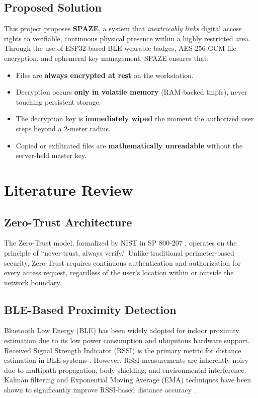 \documentclass[conference]{IEEEtran}
\begin{document}
\subsection{Proposed Solution}
This project proposes \textbf{SPAZE}, a system that \textit{inextricably links} digital access rights to verifiable, continuous physical presence within a highly restricted area. Through the use of ESP32-based BLE wearable badges, AES-256-GCM file encryption, and ephemeral key management, SPAZE ensures that:
\begin{itemize}[noitemsep]
    \item Files are \textbf{always encrypted at rest} on the workstation.
    \item Decryption occurs \textbf{only in volatile memory} (RAM-backed tmpfs), never touching persistent storage.
    \item The decryption key is \textbf{immediately wiped} the moment the authorized user steps beyond a 2-meter radius.
    \item Copied or exfiltrated files are \textbf{mathematically unreadable} without the server-held master key.
\end{itemize}

\section{Literature Review}

\subsection{Zero-Trust Architecture}
The Zero-Trust model, formalized by NIST in SP 800-207 \cite{nist_zerotrust}, operates on the principle of ``never trust, always verify.'' Unlike traditional perimeter-based security, Zero-Trust requires continuous authentication and authorization for every access request, regardless of the user's location within or outside the network boundary.

\subsection{BLE-Based Proximity Detection}
Bluetooth Low Energy (BLE) has been widely adopted for indoor proximity estimation due to its low power consumption and ubiquitous hardware support. Received Signal Strength Indicator (RSSI) is the primary metric for distance estimation in BLE systems \cite{ble_rssi_survey}. However, RSSI measurements are inherently noisy due to multipath propagation, body shielding, and environmental interference. Kalman filtering and Exponential Moving Average (EMA) techniques have been shown to significantly improve RSSI-based distance accuracy \cite{kalman_ble}.
\end{document}
